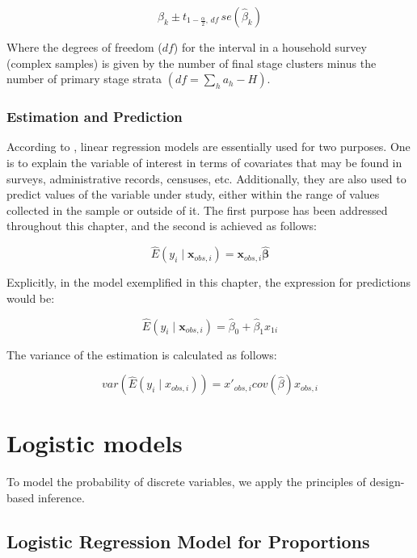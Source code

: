 \documentclass[
  12pt,
]{book}
\begin{document}
\[
\hat{\beta}_{k}\pm t_{1-\frac{\alpha}{2},\,df}\,se\left(\hat{\beta}_{k}\right)
\]

Where the degrees of freedom (\(df\)) for the interval in a household survey (complex samples) is given by the number of final stage clusters minus the number of primary stage strata \(\left(df=\sum_{h}a_{h}-H\right)\).

\hypertarget{estimation-and-prediction}{%
\subsubsection{Estimation and Prediction}\label{estimation-and-prediction}}

According to \citet{neter1996applied}, linear regression models are essentially used for two purposes. One is to explain the variable of interest in terms of covariates that may be found in surveys, administrative records, censuses, etc. Additionally, they are also used to predict values of the variable under study, either within the range of values collected in the sample or outside of it. The first purpose has been addressed throughout this chapter, and the second is achieved as follows:

\[
\hat{E}(y_{i}\mid\boldsymbol{x}_{obs,i})=\boldsymbol{x}_{obs,i}\hat{\boldsymbol{\beta}}
\]

Explicitly, in the model exemplified in this chapter, the expression for predictions would be:

\[
\hat{E}(y_{i}\mid\boldsymbol{x}_{obs,i})=\hat{\beta}_{0}+\hat{\beta}_{1}x_{1i}
\]

The variance of the estimation is calculated as follows:

\[
var\left(\hat{E}\left(y_{i}\mid x_{obs,i}\right)\right) 
=  x'_{obs,i}cov\left(\hat{\beta}\right)x{}_{obs,i}
\]

\hypertarget{logistic-models}{%
\section{Logistic models}\label{logistic-models}}

To model the probability of discrete variables, we apply the principles of design-based inference.

\hypertarget{logistic-regression-model-for-proportions}{%
\subsection{Logistic Regression Model for Proportions}\label{logistic-regression-model-for-proportions}}
\end{document}
